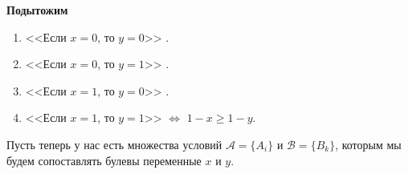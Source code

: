 \textbf{Подытожим}
\begin{enumerate}
	\item <<Если $x = 0$, то $y = 0$>> \qquad\qquad {}.
	
	\item <<Если $x = 0$, то $y = 1$>> \qquad\qquad {}.
	
	\item <<Если $x = 1$, то $y = 0$>> \qquad\qquad {}.
	
	\item <<Если $x = 1$, то $y = 1$>> \qquad\qquad {} \quad $\Longleftrightarrow$ \quad $1 - x \ge 1 - y$.
\end{enumerate}

\label{fact:complex_conditions}

Пусть теперь у нас есть множества условий $\mathcal{A} = \{A_i\}$ и $\mathcal{B} = \{B_k\}$, которым мы будем сопоставлять булевы переменные $x$ и $y$.


